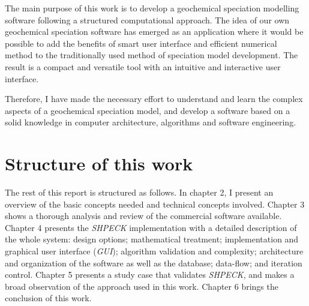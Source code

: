 The main purpose of this work is to develop a geochemical speciation modelling software following a structured computational approach. The idea of our own geochemical speciation software has emerged as an application where it would be possible to add the benefits of smart user interface and efficient numerical method to the traditionally used method of speciation model development. The result is a compact and versatile tool with an intuitive and interactive user interface.

Therefore, I have made the necessary effort to understand and learn the complex aspects of a geochemical speciation model, and develop a software based on a solid knowledge in computer architecture, algorithms and software engineering. 


\section{Structure of this work}


The rest of this report is structured as follows. In chapter 2, I present an overview of the basic concepts needed and technical concepts involved. Chapter 3 shows a thorough analysis and review of the commercial software available. Chapter 4 presents the \emph{SHPECK} implementation with a detailed description of the whole system: design options; mathematical treatment; implementation and graphical user interface (\emph{GUI}); algorithm validation and complexity; architecture and organization of the software as well as the database; data-flow; and iteration control. Chapter 5 presents a study case that validates \emph{SHPECK}, and makes a broad observation of the approach used in this work. Chapter 6 brings the conclusion of this work.